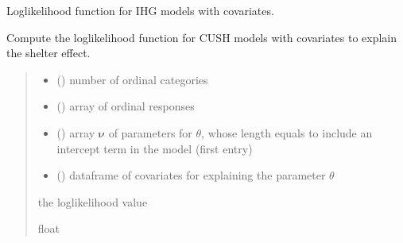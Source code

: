 \documentclass[letterpaper,10pt,english]{sphinxmanual}
\begin{document}
\begin{fulllineitems}
\label{\detokenize{cubmods:cubmods.ihg_v.loglik}}
\pysigstartsignatures
{}
\pysigstopsignatures
\sphinxAtStartPar
Log\sphinxhyphen{}likelihood function for IHG models with covariates.

\sphinxAtStartPar
Compute the log\sphinxhyphen{}likelihood function for CUSH models with covariates 
to explain the shelter effect.
\begin{quote}\begin{description}
\begin{itemize}
\item {} 
\sphinxAtStartPar
{} () \textendash{} number of ordinal categories

\item {} 
\sphinxAtStartPar
{} () \textendash{} array of ordinal responses

\item {} 
\sphinxAtStartPar
{} () \textendash{} array \(\pmb \nu\) of parameters for \(\theta\), whose length equals 
 to include an intercept term in the model (first entry)

\item {} 
\sphinxAtStartPar
{} () \textendash{} dataframe of covariates for explaining the parameter \(\theta\)

\end{itemize}

\sphinxAtStartPar
the log\sphinxhyphen{}likelihood value

\sphinxAtStartPar
float

\end{description}\end{quote}

\end{fulllineitems}
\end{document}
